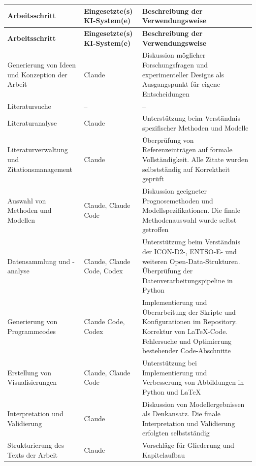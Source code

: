 \documentclass[
  paper=a4,
  fontsize=10pt,
  toc=bib,
  titlepage=firstiscover,
  headings=big
]{scrartcl}
\theoremstyle{definition}
\begin{document}
\begin{longtable}{@{}>{\raggedright\arraybackslash}p{}
                    >{\raggedright\arraybackslash}p{}
                    >{\raggedright\arraybackslash}p{}@{}}
\toprule
\textbf{Arbeitsschritt} & \textbf{Eingesetzte(s) KI-System(e)} &
\textbf{Beschreibung der Verwendungsweise} \\
\midrule
\endfirsthead
\toprule
\textbf{Arbeitsschritt} & \textbf{Eingesetzte(s) KI-System(e)} &
\textbf{Beschreibung der Verwendungsweise} \\
\midrule
\endhead
\bottomrule
\endlastfoot
Generierung von Ideen und Konzeption der Arbeit & Claude &
Diskussion m\"oglicher Forschungsfragen und experimenteller Designs als
Ausgangspunkt f\"ur eigene Entscheidungen \\
\addlinespace
Literatursuche & -- & -- \\
\addlinespace
Literaturanalyse & Claude & Unterst\"utzung beim Verst\"andnis spezifischer
Methoden und Modelle \\
\addlinespace
Literaturverwaltung und Zitationsmanagement & Claude &
\"Uberpr\"ufung von Referenzeintr\"agen auf formale Vollst\"andigkeit. Alle
Zitate wurden selbstst\"andig auf Korrektheit gepr\"uft \\
\addlinespace
Auswahl von Methoden und Modellen & Claude, Claude Code &
Diskussion geeigneter Prognosemethoden und Modellspezifikationen. Die finale
Methodenauswahl wurde selbst getroffen \\
\addlinespace
Datensammlung und -analyse & Claude, Claude Code, Codex &
Unterst\"utzung beim Verst\"andnis der ICON-D2-, \mbox{ENTSO-E}- und weiteren
Open-Data-Strukturen. \"Uberpr\"ufung der Datenverarbeitungspipeline in Python \\
\addlinespace
Generierung von Programmcodes & Claude Code, Codex &
Implementierung und \"Uberarbeitung der Skripte und Konfigurationen im
Repository. Korrektur von LaTeX-Code. Fehlersuche und Optimierung bestehender
Code-Abschnitte \\
\addlinespace
Erstellung von Visualisierungen & Claude, Claude Code &
Unterst\"utzung bei Implementierung und Verbesserung von Abbildungen in Python
und LaTeX \\
\addlinespace
Interpretation und Validierung & Claude &
Diskussion von Modellergebnissen als Denkansatz. Die finale Interpretation und
Validierung erfolgten selbstst\"andig \\
\addlinespace
Strukturierung des Texts der Arbeit & Claude &
Vorschl\"age f\"ur Gliederung und Kapitelaufbau \\

\end{longtable}
\end{document}
